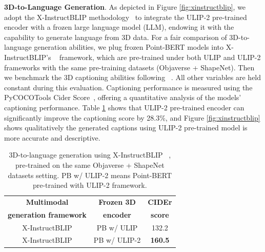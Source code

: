 \documentclass[10pt,twocolumn,letterpaper]{article}
\begin{document}
\noindent\textbf{3D-to-Language Generation}. As depicted in Figure \ref{fig:xinstructblip}, we adopt the X-InstructBLIP methodology~\citep{xinstructblip} to integrate the ULIP-2 pre-trained encoder with a frozen large language model (LLM), endowing it with the capability to generate language from 3D data. For a fair comparison of 3D-to-language generation abilities, we plug frozen Point-BERT models into X-InstructBLIP's ~\citep{xinstructblip} framework, which are pre-trained under both ULIP and ULIP-2 frameworks with the same pre-training datasets (Objaverse + ShapeNet). Then we benchmark the 3D captioning abilities following ~\citep{xinstructblip}. All other variables are held constant during this evaluation. Captioning performance is measured using the PyCOCOTools Cider Score~\citep{vedantam2015cider}, offering a quantitative analysis of the models' captioning performance. Table \ref{tab:3d_captioning} shows that ULIP-2 pre-trained encoder can significantly improve the captioning score by 28.3\%, and Figure \ref{fig:xinstructblip} shows qualitatively the generated captions using ULIP-2 pre-trained model is more accurate and descriptive.

\begin{table}[h]
    \centering
    \vspace{-3mm}
    \small
    \begin{tabular}{ccc}
        \toprule
        \textbf{Multimodal} & \textbf{Frozen 3D} & \textbf{CIDEr} \\
        \textbf{generation framework} & \textbf{encoder} & \textbf{score} \\
        \midrule
        X-InstructBLIP & PB w/ ULIP & 132.2 \\
        X-InstructBLIP & PB w/ ULIP-2 & \textbf{160.5}
        \\
        \bottomrule
    \end{tabular}
    \caption{3D-to-language generation using X-InstructBLIP ~\citep{xinstructblip}, pre-trained on the same Objaverse + ShapeNet datasets setting. PB w/ ULIP-2 means Point-BERT pre-trained with ULIP-2 framework.}
    \label{tab:3d_captioning}
    \vspace{-2mm}
\end{table}
\end{document}
